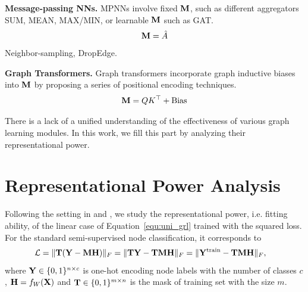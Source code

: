\documentclass{article} %
\begin{document}
	\textbf{Message-passing NNs.}
	MPNNs involve fixed ${\mathbf{M}}$, such as different aggregators SUM, MEAN, MAX/MIN, or learnable ${\mathbf{M}}$ such as GAT.
	\begin{equation}
		\begin{aligned}
			{\mathbf{M}}=\hat A
		\end{aligned}
	\end{equation}
	Neighbor-sampling, DropEdge.
	
	\textbf{Graph Transformers.}
	Graph transformers incorporate graph inductive biases into ${\mathbf{M}}$ by proposing a series of positional encoding techniques.
	\begin{equation}
		\begin{aligned}
			{\mathbf{M}}=QK^{\top}+\textrm{Bias}
		\end{aligned}
	\end{equation}
	
	There is a lack of a unified understanding of the effectiveness of various graph learning modules.
	In this work, we fill this part by analyzing their representational power.
	
	\section{Representational Power Analysis}
	
	
	Following the setting in \citet{xu2021optimization} and \citet{JacobiConv}, we study the representational power, i.e. fitting ability, of the linear case of Equation~\ref{equ:uni_grl} trained with the squared loss.
	For the standard semi-supervised node classification, it corresponds to
	\begin{equation}
		\label{equ:square}
		\begin{aligned}
			{\mathcal{L}}&=\|{\mathbf{T}}({\mathbf{Y}}-{\mathbf{M}}{\mathbf{H}})\|_F=\|{\mathbf{T}}{\mathbf{Y}}-{\mathbf{T}}{\mathbf{M}}{\mathbf{H}}\|_F=\|{\mathbf{Y}}^{\textrm{train}}-{\mathbf{T}}{\mathbf{M}}{\mathbf{H}}\|_F,
		\end{aligned}
	\end{equation}
	where ${\mathbf{Y}}\in\{0,1\}^{n\times c}$ is one-hot encoding node labels with the number of classes $c$, ${\mathbf{H}}=f_W({\mathbf{X}})$ and ${\mathbf{T}}\in\{0,1\}^{m\times n}$ is the mask of training set with the size $m$.
	
\end{document}

